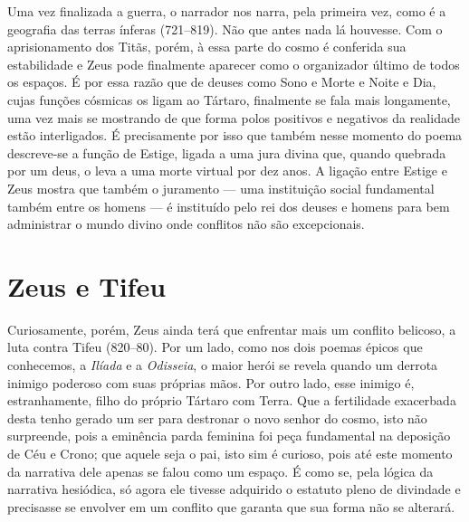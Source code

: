 Uma vez finalizada a guerra, o narrador nos narra, pela primeira vez,
como é a geografia das terras ínferas (721--819). Não que antes nada lá
houvesse. Com o aprisionamento dos Titãs, porém, à essa parte do cosmo é
conferida sua estabilidade e Zeus pode finalmente aparecer como o
organizador último de todos os espaços. É por essa razão que de deuses
como Sono e Morte e Noite e Dia, cujas funções cósmicas os ligam ao
Tártaro, finalmente se fala mais longamente, uma vez mais se mostrando
de que forma polos positivos e negativos da realidade estão
interligados. É precisamente por isso que também nesse momento do poema
descreve-se a função de Estige, ligada a uma jura divina que, quando
quebrada por um deus, o leva a uma morte virtual por dez anos. A ligação
entre Estige e Zeus mostra que também o juramento --- uma instituição
social fundamental também entre os homens --- é instituído pelo rei dos
deuses e homens para bem administrar o mundo divino onde conflitos não
são excepcionais.

\section{Zeus e Tifeu}

Curiosamente, porém, Zeus ainda terá que enfrentar mais um conflito
belicoso, a luta contra Tifeu (820--80). Por um lado, como nos dois
poemas épicos que conhecemos, a \textit{Ilíada} e a \textit{Odisseia}, o
maior herói se revela quando um derrota inimigo poderoso com suas
próprias mãos. Por outro lado, esse inimigo é, estranhamente, filho do
próprio Tártaro com Terra. Que a fertilidade exacerbada desta tenho
gerado um ser para destronar o novo senhor do cosmo, isto não
surpreende, pois a eminência parda feminina foi peça fundamental na
deposição de Céu e Crono; que aquele seja o pai, isto sim é curioso,
pois até este momento da narrativa dele apenas se falou como um espaço.
É como se, pela lógica da narrativa hesiódica, só agora ele tivesse
adquirido o estatuto pleno de divindade e precisasse se envolver em um
conflito que garanta que sua forma não se alterará.


